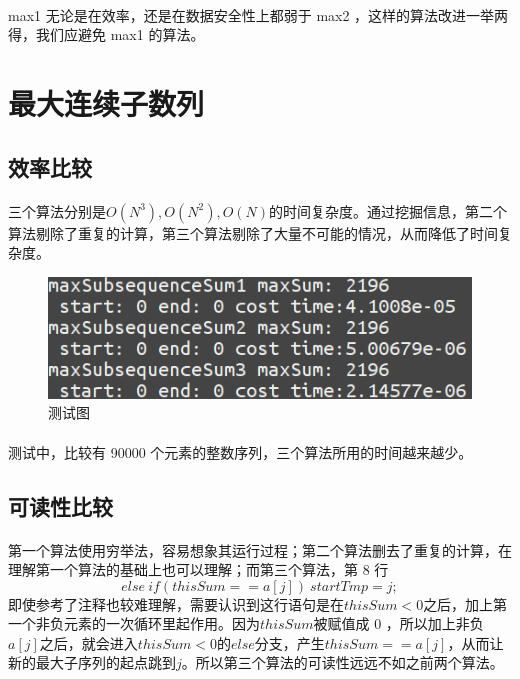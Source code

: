 \documentclass[UTF-8, 12pt]{ctexart}
\begin{document}
    \paragraph{}
    max1 无论是在效率，还是在数据安全性上都弱于 max2 ，这样的算法改进一举两得，我们应避免 max1 的算法。

\section{最大连续子数列}
    \subsection{效率比较}
    \paragraph{}
    三个算法分别是$O(N^3), O(N^2), O(N)$的时间复杂度。通过挖掘信息，第二个算法剔除了重复的计算，第三个算法剔除了大量不可能的情况，从而降低了时间复杂度。
    \begin{figure}[h]
    \centering
    \includegraphics[width = .8\textwidth]{2.png}
    \caption{测试图}
    \end{figure}
    \paragraph{}
    测试中，比较有 90000 个元素的整数序列，三个算法所用的时间越来越少。

    \subsection{可读性比较}
    \paragraph{}
    第一个算法使用穷举法，容易想象其运行过程；第二个算法删去了重复的计算，在理解第一个算法的基础上也可以理解；而第三个算法，第 8 行
    \[ else \ if(thisSum == a[j]) \ startTmp = j; \]
    即使参考了注释也较难理解，需要认识到这行语句是在$ thisSum < 0$之后，加上第一个非负元素的一次循环里起作用。因为$thisSum$被赋值成 0 ，所以加上非负$a[j]$之后，就会进入$thisSum < 0$的$else$分支，产生$thisSum == a[j]$，从而让新的最大子序列的起点跳到$j$。所以第三个算法的可读性远远不如之前两个算法。
\end{document}
